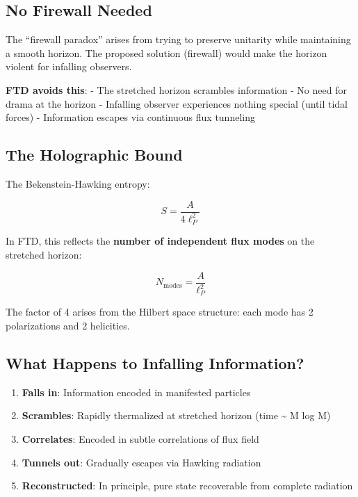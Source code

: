 \documentclass[
  11pt,
  letterpaper,
  twoside,
  openright]{book}
\providecommand{\tightlist}{%
  \setlength{\itemsep}{0pt}\setlength{\parskip}{0pt}}
\begin{document}
\subsection{No Firewall Needed}\label{no-firewall-needed}

The ``firewall paradox'' arises from trying to preserve unitarity while
maintaining a smooth horizon. The proposed solution (firewall) would
make the horizon violent for infalling observers.

\textbf{FTD avoids this}: - The stretched horizon scrambles information
- No need for drama at the horizon - Infalling observer experiences
nothing special (until tidal forces) - Information escapes via
continuous flux tunneling

\subsection{The Holographic Bound}\label{the-holographic-bound}

The Bekenstein-Hawking entropy:

\[S = \frac{A}{4\ell_P^2}\]

In FTD, this reflects the \textbf{number of independent flux modes} on
the stretched horizon:

\[N_{\text{modes}} = \frac{A}{\ell_P^2}\]

The factor of 4 arises from the Hilbert space structure: each mode has 2
polarizations and 2 helicities.

\subsection{What Happens to Infalling
Information?}\label{what-happens-to-infalling-information}

\begin{enumerate}
\def\labelenumi{\arabic{enumi}.}
\tightlist
\item
  \textbf{Falls in}: Information encoded in manifested particles
\item
  \textbf{Scrambles}: Rapidly thermalized at stretched horizon (time
  \textasciitilde{} M log M)
\item
  \textbf{Correlates}: Encoded in subtle correlations of flux field
\item
  \textbf{Tunnels out}: Gradually escapes via Hawking radiation
\item
  \textbf{Reconstructed}: In principle, pure state recoverable from
  complete radiation
\end{enumerate}
\end{document}

